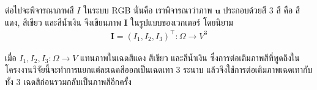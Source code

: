 \hspace{1cm} ต่อไปจะพิจารณาภาพสี $I$ ในระบบ RGB นั่นคือ เราพิจารณาว่าภาพ $\boldsymbol{u}$ ประกอบด้วยสี 3 สี คือ สีแดง, สีเขียว และสีน้ำเงิน จึงเขียนภาพ $\boldsymbol{I}$  ในรูปแบบของเวกเตอร์ โดยนิยาม
\begin{align*}
	\boldsymbol{I} = (I_1,I_2,I_3)^{\top} : \Omega  \rightarrow V^3	
\end{align*}

\noindent เมื่อ $I_1,I_2,I_3: \Omega  \rightarrow V$ แทนภาพในเฉดสีแดง สีเขียว และสีน้ำเงิน ซึ่งการต่อเติมภาพสีที่พูดถึงในโครงงานวิจัยนี้จะทำการแยกแต่ละเฉดสีออกเป็นเฉดเทา 3 ระนาบ แล้วจึงใช้การต่อเติมภาพเฉดเทากับทั้ง 3 เฉดสีก่อนรวมกลับเป็นภาพสีอีกครั้ง

